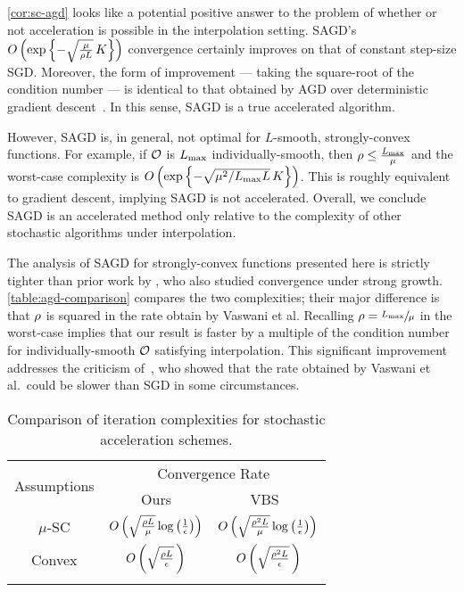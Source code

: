 \autoref{cor:sc-agd} looks like a potential positive answer to the problem of whether or not acceleration is possible in the interpolation setting.
\ac{SAGD}'s \( O\rbr{ \exp \cbr{- \sqrt{\frac{\mu}{\sgc L}} \, K}} \) convergence certainly improves on that of constant step-size \ac{SGD}.
Moreover, the form of improvement --- taking the square-root of the condition number --- is identical to that obtained by \ac{AGD} over deterministic gradient descent~\citep{nesterov2004lectures}.
In this sense, \ac{SAGD} is a true accelerated algorithm.

However, \ac{SAGD} is, in general, not optimal for \( L \)-smooth, strongly-convex functions. 
For example, if \( \oracle{} \) is \( \Lmax \) individually-smooth, then \( \sgc \leq \frac{\Lmax}{\mu} \) and the worst-case complexity is \( O\rbr{ \exp \cbr{- \sqrt{\mu^2 / \Lmax L} \, K}}\).
This is roughly equivalent to gradient descent, implying \ac{SAGD} is not accelerated. 
Overall, we conclude \ac{SAGD} is an accelerated method only relative to the complexity of other stochastic algorithms under interpolation.

The analysis of \ac{SAGD} for strongly-convex functions presented here is strictly tighter than prior work by \citet[Theorem 1]{vaswani2019fast}, who also studied convergence under strong growth.
\autoref{table:agd-comparison} compares the two complexities; their major difference is that \( \sgc \) is squared in the rate obtain by Vaswani et al. 
Recalling \( \sgc = \sfrac{\Lmax}{\mu} \) in the worst-case implies that our result is faster by a multiple of the condition number for individually-smooth \( \oracle{} \) satisfying interpolation.
This significant improvement addresses the criticism of~\citet{liu2020accelerating}, who showed that the rate obtained by Vaswani et al.\ could be slower than \ac{SGD} in some circumstances. 

\begin{table}[t]
    \centering
    \begin{tabular}{c c c  }\toprule
        \multirow{2}{*}{Assumptions} & \multicolumn{2}{c}{Convergence Rate}\\%
        \cmidrule(lr){2-3} 
                 & \multicolumn{1}{c}{Ours} & \multicolumn{1}{c}{VBS~\citep{vaswani2019painless}}\\ \midrule
        \( \mu \)-SC & \( O\rbr{\sqrt{\frac{\rho L}{\mu}} \log\rbr{\frac{1}{\epsilon}}} \)%
                     & \( O\rbr{\sqrt{\frac{\rho^2 L}{\mu}} \log\rbr{\frac{1}{\epsilon}}} \) \\ \addlinespace
        Convex       & \( O\rbr{\sqrt{\frac{\sgc L}{\epsilon}}\,} \)%
                     & \( O\rbr{\sqrt{\frac{\sgc^2 L}{\epsilon}}\,} \)\\ \addlinespace 
        \end{tabular}
        \caption{Comparison of iteration complexities for stochastic acceleration schemes.}%
    \label{table:agd-comparison}
\end{table}

